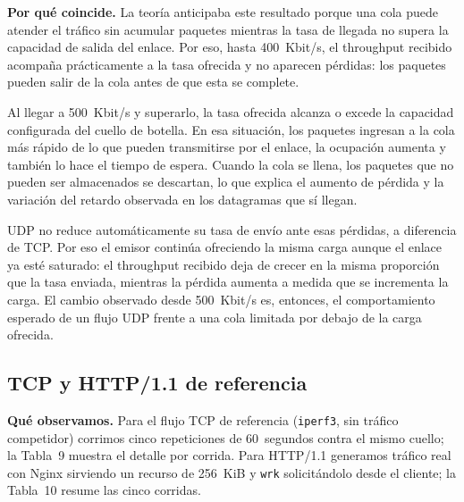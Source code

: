 \documentclass[11pt,a4paper]{article}
\begin{document}
\textbf{Por qu\'e coincide.} La teor\'ia anticipaba este resultado porque una cola puede atender el tr\'afico sin acumular paquetes mientras la tasa de llegada no supera la capacidad de salida del enlace. Por eso, hasta 400~Kbit/s, el throughput recibido acompa\~na pr\'acticamente a la tasa ofrecida y no aparecen p\'erdidas: los paquetes pueden salir de la cola antes de que esta se complete.

Al llegar a 500~Kbit/s y superarlo, la tasa ofrecida alcanza o excede la capacidad configurada del cuello de botella. En esa situaci\'on, los paquetes ingresan a la cola m\'as r\'apido de lo que pueden transmitirse por el enlace, la ocupaci\'on aumenta y tambi\'en lo hace el tiempo de espera. Cuando la cola se llena, los paquetes que no pueden ser almacenados se descartan, lo que explica el aumento de p\'erdida y la variaci\'on del retardo observada en los datagramas que s\'i llegan.

UDP no reduce autom\'aticamente su tasa de env\'io ante esas p\'erdidas, a diferencia de TCP. Por eso el emisor contin\'ua ofreciendo la misma carga aunque el enlace ya est\'e saturado: el throughput recibido deja de crecer en la misma proporci\'on que la tasa enviada, mientras la p\'erdida aumenta a medida que se incrementa la carga. El cambio observado desde 500~Kbit/s es, entonces, el comportamiento esperado de un flujo UDP frente a una cola limitada por debajo de la carga ofrecida.

\subsection*{TCP y HTTP/1.1 de referencia}

\textbf{Qu\'e observamos.} Para el flujo TCP de referencia (\texttt{iperf3}, sin tr\'afico competidor) corrimos cinco repeticiones de 60~segundos contra el mismo cuello; la Tabla~9 muestra el detalle por corrida. Para HTTP/1.1 generamos tr\'afico real con Nginx sirviendo un recurso de 256~KiB y \texttt{wrk} solicit\'andolo desde el cliente; la Tabla~10 resume las cinco corridas.
\end{document}
